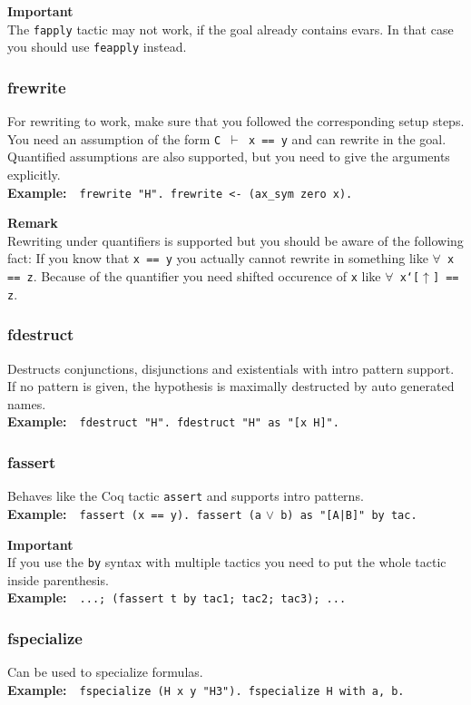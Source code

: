 \documentclass[12pt, a4paper]{article}
\newcommand{\coq}[1]{\texttt{#1}}
\newcommand{\important}[1]{
	\vspace{3pt}
	\begin{boximportant}
		\parbox{\textwidth}{\textcolor{colorimportant}{\textbf{Important}\\#1}}
	\end{boximportant}}
\newcommand{\remark}[1]{
	\vspace{3pt}
	\begin{boxremark}
		\parbox{\textwidth}{\textbf{Remark}\\#1}
	\end{boxremark}}
\newcommand{\example}[1]{\medskip\\\textbf{Example:}~~#1}
\begin{document}
\important{The \texttt{fapply} tactic may not work, if the goal already contains evars. In that case you should use \texttt{feapply} instead.}



\subsubsection{\ttfamily frewrite}

For rewriting to work, make sure that you followed the corresponding setup steps.
You need an assumption of the form \texttt{C $\vdash$ x == y} and can rewrite in the goal.
Quantified assumptions are also supported, but you need to give the arguments explicitly.
\example{\coq{frewrite "H". frewrite <- (ax_sym zero x).}}

\remark{Rewriting under quantifiers is supported but you should be aware of the following fact: If you know that \coq{x == y} you actually cannot rewrite in something like \texttt{$\forall$~\coq{x == z}}. Because of the quantifier you need shifted occurence of \coq{x} like \texttt{$\forall$~\coq{x`[}$\uparrow$\coq{] == z}}.}


\subsubsection{\ttfamily fdestruct}

Destructs conjunctions, disjunctions and existentials with intro pattern support. 
If no pattern is given, the hypothesis is maximally destructed by auto generated names.
\example{\coq{fdestruct "H". fdestruct "H" as "[x H]".}}


\subsubsection{\ttfamily fassert}

Behaves like the Coq tactic \texttt{assert} and supports intro patterns.
\example{\coq{fassert (x == y). fassert (a} $\lor$\coq{ b) as "[A|B]" by tac.}}

\important{If you use the \texttt{by} syntax with multiple tactics you need to put the whole tactic inside parenthesis. \example{\texttt{...; (fassert t by tac1; tac2; tac3); ...}}}


\subsubsection{\ttfamily fspecialize}

Can be used to specialize formulas.
\example{\coq{fspecialize (H x y "H3"). fspecialize H with a, b.}}
\end{document}
